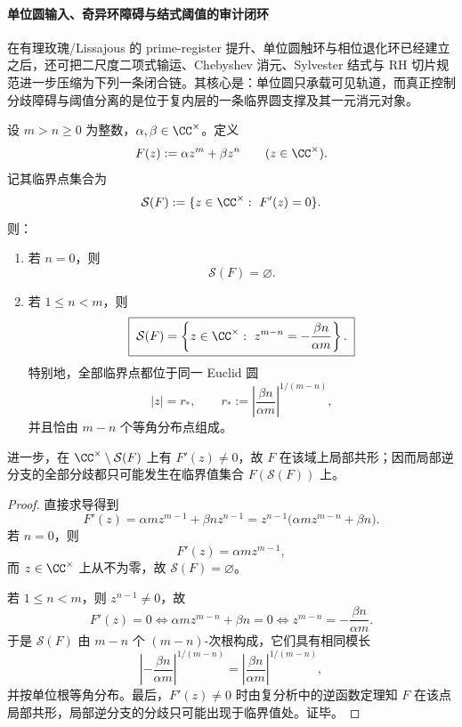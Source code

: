 \paragraph{单位圆输入、奇异环障碍与结式阈值的审计闭环}
在有理玫瑰/Lissajous 的 prime-register 提升、单位圆触环与相位退化环已经建立之后，还可把二尺度二项式输运、Chebyshev 消元、Sylvester 结式与 RH 切片规范进一步压缩为下列一条闭合链。其核心是：单位圆只承载可见轨道，而真正控制分歧障碍与阈值分离的是位于复内层的一条临界圆支撑及其一元消元对象。

\begin{theorem}[二尺度二项式输运的单位圆层与临界圆支撑]\label{thm:xi-time-part62d-two-scale-binomial-transport-singular-circle}
设 \(m>n\ge 0\) 为整数，\(\alpha,\beta\in\CC^\times\)。定义
\[
F(z):=\alpha z^m+\beta z^n
\qquad (z\in\CC^\times).
\]
记其临界点集合为
\[
\mathcal S(F):=\{z\in\CC^\times:\ F'(z)=0\}.
\]
则：
\begin{enumerate}
  \item 若 \(n=0\)，则
  \[
  \mathcal S(F)=\varnothing.
  \]
  \item 若 \(1\le n<m\)，则
  \[
  \boxed{\;
  \mathcal S(F)=
  \left\{
  z\in\CC^\times:\ 
  z^{m-n}=-\frac{\beta n}{\alpha m}
  \right\}.\;}
  \]
  特别地，全部临界点都位于同一 Euclid 圆
  \[
  |z|=r_\ast,
  \qquad
  r_\ast:=
  \left|\frac{\beta n}{\alpha m}\right|^{1/(m-n)},
  \]
  并且恰由 \(m-n\) 个等角分布点组成。
\end{enumerate}
进一步，在 \(\CC^\times\setminus\mathcal S(F)\) 上有 \(F'(z)\neq 0\)，故 \(F\) 在该域上局部共形；因而局部逆分支的全部分歧都只可能发生在临界值集合 \(F(\mathcal S(F))\) 上。
\end{theorem}
\begin{proof}
直接求导得到
\[
F'(z)=\alpha m z^{m-1}+\beta n z^{n-1}
=
z^{n-1}\bigl(\alpha m z^{m-n}+\beta n\bigr).
\]
若 \(n=0\)，则
\[
F'(z)=\alpha m z^{m-1},
\]
而 \(z\in\CC^\times\) 上从不为零，故 \(\mathcal S(F)=\varnothing\)。

若 \(1\le n<m\)，则 \(z^{n-1}\neq 0\)，故
\[
F'(z)=0
\iff
\alpha m z^{m-n}+\beta n=0
\iff
z^{m-n}=-\frac{\beta n}{\alpha m}.
\]
于是 \(\mathcal S(F)\) 由 \(m-n\) 个 \((m-n)\)-次根构成，它们具有相同模长
\[
\left|-\frac{\beta n}{\alpha m}\right|^{1/(m-n)}
=
\left|\frac{\beta n}{\alpha m}\right|^{1/(m-n)},
\]
并按单位根等角分布。最后，\(F'(z)\neq 0\) 时由复分析中的逆函数定理知 \(F\) 在该点局部共形，局部逆分支的分歧只可能出现于临界值处。证毕。
\end{proof}

